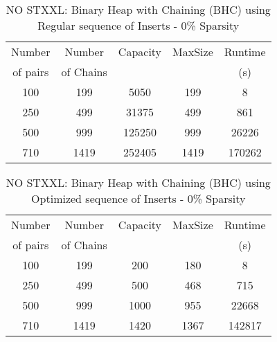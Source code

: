 \documentclass[11pt, one-sided]{amsart}
\begin{document}
\newpage



\begin{table}[htbp]
   \centering
      \caption{NO STXXL: Binary Heap with Chaining (BHC) using Regular sequence of Inserts  - 0\% Sparsity} 
   \begin{tabular}{|c|c|c|c|c|}
   	\hline
		 Number   & Number		& Capacity	& MaxSize	&	Runtime		\\ 
		 of pairs 	& of Chains  	& 			&  			& 	 (s)			\\ \hline
		 100		& 199 	       	& 5050	     	&	199	      	&	8			\\
		 250		& 499   	       	& 31375    	& 499	      	&	 861			\\
		 500		& 999	      	&125250    	&	999         	&	26226		\\
		 710		& 1419	   	&252405    	&	1419	      	&	170262		\\
	\hline
   \end{tabular}
   \label{tab:booktabs}
\end{table}



\newpage



\begin{table}[htbp]
   \centering
      \caption{NO STXXL: Binary Heap with Chaining (BHC) using Optimized sequence of Inserts  - 0\% Sparsity} 
   \begin{tabular}{|c|c|c|c|c|}
   	\hline
		 Number	& 	Number    		& 	Capacity 	& 	MaxSize 	& Runtime    	 		 \\ 
		 of pairs 	& 	of Chains 		&			& 			&	 (s)				\\ \hline
		 100		& 	199 	   		&	 200	    	&	180	      	&	8	       			\\
		 250		& 	499   	   	&	500   	& 	468	      	&       715	       			\\
		 500		& 	999	   		&	1000	  	&	955	     	&	22668			\\
		 710		& 	1419	   		&	1420	   	&	1367	      	& 	142817         		\\
	\hline
   \end{tabular}
   \label{tab:booktabs}
\end{table}
\end{document}
